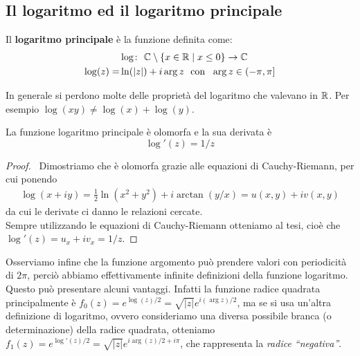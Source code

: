 \subsection{\textcolor{AnComp}{\textbf{Il logaritmo ed il logaritmo principale}}}
	
	\begin{definition}
		\label{defn:logaritmo-principale}
		Il \textbf{logaritmo principale} è la funzione definita come:
		\begin{align*}
		& \log \colon\ \mathbb{C} \setminus \{x \in \mathbb{R} \mid x \le 0\} \rightarrow \mathbb{C} \\
		\log(z) = & \ln(|z|) + i\arg z \ \text{  con  } \ \arg z \in (-\pi,\pi]
		\end{align*}
		
	\end{definition}

	\begin{remark}
		In generale si perdono molte delle proprietà del logaritmo che valevano in $\mathbb{R}$. Per esempio $\log(xy) \neq \log(x)+\log(y)$.
	\end{remark}

	\begin{theorem}
		La funzione logaritmo principale è olomorfa e la sua derivata è 
		\begin{equation*}
			\log'(z) = 1/z
		\end{equation*}
	\end{theorem}
	\begin{proof} \
		Dimostriamo che è olomorfa grazie alle equazioni di Cauchy-Riemann, per cui ponendo
		\begin{equation*}
		\begin{aligned}
			\log(x+iy) = \frac{1}{2}\ln(x^2 + y^2) + i\arctan(y/x) = u(x,y) + iv(x,y)
		\end{aligned}
		\end{equation*}
		da cui le derivate ci danno le relazioni cercate.\\
		
		Sempre utilizzando le equazioni di Cauchy-Riemann otteniamo al tesi, cioè che $\log'(z) = u_x + iv_x = 1/z$.
	\end{proof}
	\begin{remark}
		Osserviamo infine che la funzione argomento può prendere valori con periodicità di $2\pi$, perciò abbiamo effettivamente infinite definizioni della funzione logaritmo. \\ Questo può presentare alcuni vantaggi. Infatti la funzione radice quadrata principalmente è 
		$f_0(z) = e^{\log(z)/2} = \sqrt{|z|}e^{i(\arg z)/2}$, ma se si usa un'altra definizione di logaritmo, ovvero consideriamo una diversa possibile branca (o determinazione) della radice quadrata, otteniamo $f_1(z) = e^{\log'(z)/2} = \sqrt{|z|}e^{i\arg(z)/2 + i\pi}$, che rappresenta la \textit{radice ``negativa''}. 
	\end{remark}

